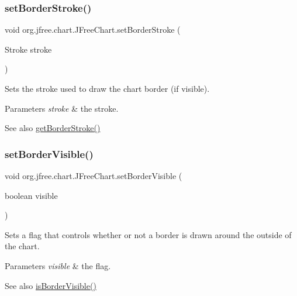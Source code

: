 \subsubsection{\texorpdfstring{set\+Border\+Stroke()}{setBorderStroke()}}
{\footnotesize\ttfamily void org.\+jfree.\+chart.\+J\+Free\+Chart.\+set\+Border\+Stroke (\begin{DoxyParamCaption}\item[{Stroke}]{stroke }\end{DoxyParamCaption})}

Sets the stroke used to draw the chart border (if visible).


\begin{DoxyParams}{Parameters}
{\em stroke} & the stroke.\\
\hline
\end{DoxyParams}
\begin{DoxySeeAlso}{See also}
\mbox{\hyperlink{classorg_1_1jfree_1_1chart_1_1_j_free_chart_a505a44c119435bb9f7b8cb15d6bec167}{get\+Border\+Stroke()}} 
\end{DoxySeeAlso}
\mbox{\label{classorg_1_1jfree_1_1chart_1_1_j_free_chart_a5c51189211b4cff88055842e15527453}} 
\subsubsection{\texorpdfstring{set\+Border\+Visible()}{setBorderVisible()}}
{\footnotesize\ttfamily void org.\+jfree.\+chart.\+J\+Free\+Chart.\+set\+Border\+Visible (\begin{DoxyParamCaption}\item[{boolean}]{visible }\end{DoxyParamCaption})}

Sets a flag that controls whether or not a border is drawn around the outside of the chart.


\begin{DoxyParams}{Parameters}
{\em visible} & the flag.\\
\hline
\end{DoxyParams}
\begin{DoxySeeAlso}{See also}
\mbox{\hyperlink{classorg_1_1jfree_1_1chart_1_1_j_free_chart_a7841abb23a8d2f417b8f424cfd5aed5c}{is\+Border\+Visible()}} 
\end{DoxySeeAlso}
\mbox{\label{classorg_1_1jfree_1_1chart_1_1_j_free_chart_a7756201ec1d421db8880a1c243d2f6f9}} 
